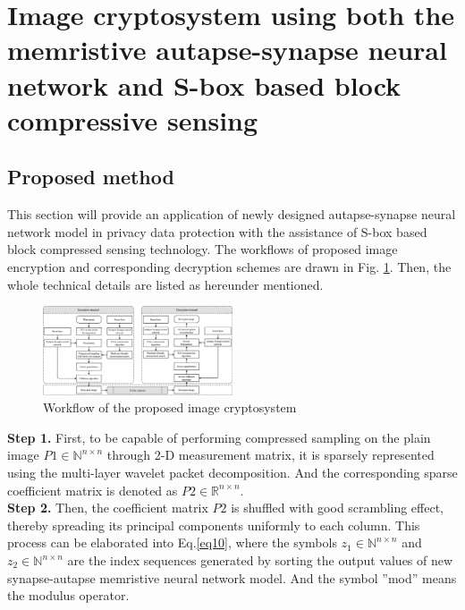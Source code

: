 \documentclass[journal]{IEEEtran/IEEEtran}
\begin{document}
\section{Image cryptosystem using both the memristive autapse-synapse neural network and S-box based block compressive sensing}
\label{sec4}

\subsection{Proposed method}


This section will provide an application of newly designed autapse-synapse neural network model in privacy data protection with the assistance of S-box based block compressed sensing technology. The workflows of proposed image encryption and corresponding decryption schemes are drawn in Fig. \ref{fig5}. Then, the whole technical details are listed as hereunder mentioned.\\

\begin{figure}[!t]
	\centering
	\includegraphics[width=0.5\textwidth]{fig5.png}
		\caption{Workflow of the proposed image cryptosystem}
	\label{fig5}
\end{figure}
 

\textbf{Step 1.} First, to be capable of performing compressed sampling on the plain image $P 1 \in \mathbb{N}^{n \times n}$  through 2-D measurement matrix, it is sparsely represented using the multi-layer wavelet packet decomposition. And the corresponding sparse coefficient matrix is denoted as  $P2 \in \mathbb{R}^{n \times n}$.\\

\textbf{Step 2.} Then, the coefficient matrix $P 2$  is shuffled with good scrambling effect, thereby spreading its principal components uniformly to each column. This process can be elaborated into Eq.\ref{eq10}, where the symbols  $z_{1} \in \mathbb{N}^{n \times n}$ and $z_{2} \in \mathbb{N}^{n \times n}$  are the index sequences generated by sorting the output values of new synapse-autapse memristive neural network model. And the symbol ''mod'' means the modulus operator.
\end{document}
